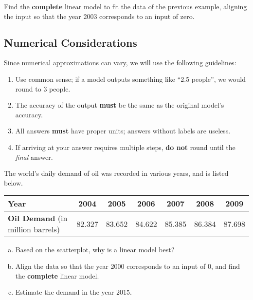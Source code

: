 \documentclass[notes]{subfiles}
\begin{document}
		\begin{ex}
			Find the \textbf{complete} linear model to fit the data of the previous example, aligning the input so that the year 2003 corresponds to an input of zero.
		\end{ex}
			
			
	\subsection*{Numerical Considerations}
		Since numerical approximations can vary, we will use the following guidelines:
		\begin{enumerate}[(1)]
			\item Use common sense; if a model outputs something like ``2.5 people'', we would round to 3 people.
			\item The accuracy of the output \textbf{must} be the same as the original model's accuracy.
			\item All answers \textbf{must} have proper units; answers without labels are useless.
			\item If arriving at your answer requires multiple steps, \textbf{do not} round until the \emph{final} answer.
		\end{enumerate}
			\vspace{.1in}
		\begin{ex}
			The world's daily demand of oil was recorded in various years, and is listed below.
			\begin{center}
				{\renewcommand{\arraystretch}{1.2}
				\begin{tabular}{|l||c|c|c|c|c|c|} \hline
					\textbf{Year} & 2004  & 2005 & 2006 & 2007 & 2008 & 2009 \\ \hline
					\textbf{Oil Demand} (in million barrels) & 82.327 & 83.652 & 84.622 & 85.385 & 86.384 & 87.698\\ \hline
				\end{tabular}	
				}
			\end{center}
			\begin{enumerate}[(a)]
				\item Based on the scatterplot, why is a linear model best?
				\item Align the data so that the year 2000 corresponds to an input of 0, and find the \textbf{complete} linear model.
				\item Estimate the demand in the year 2015.
			\end{enumerate}
		\end{ex}
			\newpage
\end{document}
